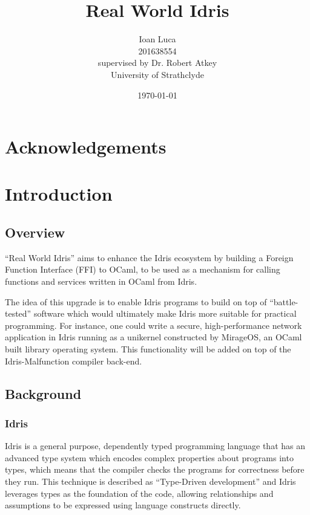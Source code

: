 \documentclass[a4paper, 12pt, oneside]{report}
\title{Real World Idris}
\author{Ioan Luca \\ 201638554 \\ \small supervised by Dr. Robert Atkey \\
	\small University of Strathclyde} %
\date{\today}
\begin{document}


\tableofcontents
\listoffigures
\listoftables

\chapter*{Acknowledgements}

\begin{abstract}
\end{abstract}


\chapter{Introduction}

\section{Overview}

``Real World Idris'' aims to enhance the Idris ecosystem by building a Foreign
Function Interface (FFI) to OCaml, to be used as a mechanism for calling
functions and services written in OCaml from Idris.

The idea of this upgrade is to enable Idris programs to build on top of
``battle-tested'' software which would ultimately make Idris more suitable
for practical programming.
For instance, one could write a secure, high-performance network application in Idris running as a unikernel constructed by MirageOS, an OCaml built library
operating system.
This functionality will be added on top of the Idris-Malfunction compiler
back-end.

\section{Background}

\subsection{Idris}
Idris is a general purpose, dependently typed programming language that has an
advanced type system which encodes complex properties about programs into
types, which means that the compiler checks the programs for correctness
before they run.
This technique is described as ``Type-Driven development'' and Idris leverages
types as the foundation of the code, allowing relationships and assumptions to
be expressed using language constructs directly.
\end{document}
